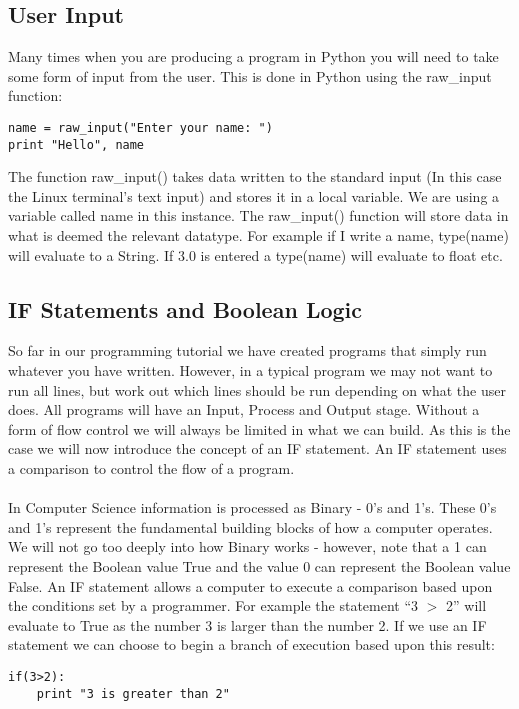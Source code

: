 \documentclass[twocolumn]{article}
\begin{document}
\subsection{User Input}
Many times when you are producing a program in Python you will need to take some form of input from the user. This is done in Python using the raw\_input function:
\begin{lstlisting}
name = raw_input("Enter your name: ") 
print "Hello", name
\end{lstlisting}
The function raw\_input() takes data written to the standard input (In this case the Linux terminal's text input) and stores it in a local variable. We are using a variable called name in this instance. The raw\_input() function will store data in what is deemed the relevant datatype. For example if I write a name, type(name) will evaluate to a String. If 3.0 is entered a type(name) will evaluate to float etc.

\subsection{IF Statements and Boolean Logic}

So far in our programming tutorial we have created programs that simply run whatever you have written. However, in a typical program we may not want to run all lines, but work out which lines should be run depending on what the user does. All programs will have an Input, Process and Output stage. Without a form of flow control we will always be limited in what we can build. As this is the case we will now introduce the concept of an IF statement. An IF statement uses a comparison to control the flow of a program.\\
\\
In Computer Science information is processed as Binary - 0's and 1's. These 0's and 1's represent the fundamental building blocks of how a computer operates. We will not go too deeply into how Binary works - however, note that a 1 can represent the Boolean value True and the value 0 can represent the Boolean value False. An IF statement allows a computer to execute a comparison based upon the conditions set by a programmer. For example the statement ``3 $>$ 2'' will evaluate to True as the number 3 is larger than the number 2. If we use an IF statement we can choose to begin a branch of execution based upon this result:
\begin{lstlisting}
if(3>2):
	print "3 is greater than 2"
\end{lstlisting}
\end{document}
